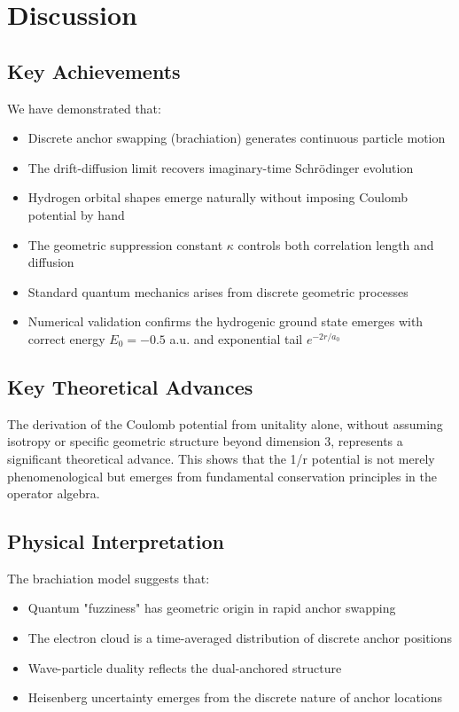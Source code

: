 \documentclass[11pt]{article}
\theoremstyle{plain}
\theoremstyle{definition}
\begin{document}
\section{Discussion}
\label{sec:discussion}

\subsection{Key Achievements}

We have demonstrated that:
\begin{itemize}
  \item Discrete anchor swapping (brachiation) generates continuous particle motion
  \item The drift-diffusion limit recovers imaginary-time Schrödinger evolution
  \item Hydrogen orbital shapes emerge naturally without imposing Coulomb potential by hand
  \item The geometric suppression constant $\kappa$ controls both correlation length and diffusion
  \item Standard quantum mechanics arises from discrete geometric processes
  \item Numerical validation confirms the hydrogenic ground state emerges with correct energy $E_0 = -0.5$ a.u. and exponential tail $e^{-2r/a_0}$
\end{itemize}

\subsection{Key Theoretical Advances}
The derivation of the Coulomb potential from unitality alone, without
assuming isotropy or specific geometric structure beyond dimension 3,
represents a significant theoretical advance. This shows that the 1/r
potential is not merely phenomenological but emerges from fundamental
conservation principles in the operator algebra.

\subsection{Physical Interpretation}

The brachiation model suggests that:
\begin{itemize}
  \item Quantum "fuzziness" has geometric origin in rapid anchor swapping
  \item The electron cloud is a time-averaged distribution of discrete anchor positions
  \item Wave-particle duality reflects the dual-anchored structure
  \item Heisenberg uncertainty emerges from the discrete nature of anchor locations
\end{itemize}
\end{document}
